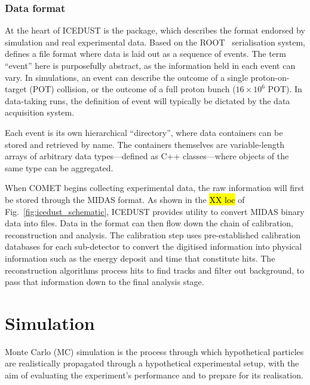 \subsubsection{Data format}
At the heart of ICEDUST is the \oaEvent package, which describes the format endorsed by simulation and real experimental data. Based on the ROOT~\cite{BRUN199781} serialisation system, \oaEvent defines a file format where data is laid out as a sequence of events. The term ``event'' here is purposefully abstract, as the information held in each event can vary. In simulations, an event can describe the outcome of a single proton-on-target (POT) collision, or the outcome of a full proton bunch ($16\times10^6$ POT). 
In data-taking runs, the definition of event will typically be dictated by the data acquisition system.  %

Each event is its own hierarchical ``directory'', where data containers can be stored and retrieved by name. The containers themselves are variable-length arrays of arbitrary data types---defined as C++ classes---where objects of the same type can be aggregated.




When COMET begins collecting experimental data, the raw information will first be stored through the MIDAS format. 
As shown in the \hl{XX loc} of Fig.~\ref{fig:icedust_schematic}, ICEDUST provides utility to convert MIDAS binary data into \oaEvent files. Data in the \oaEvent format can then flow down the chain of calibration, reconstruction and analysis.
The calibration step uses pre-established calibration databases for each sub-detector to convert the digitised information into physical information such as the energy deposit and time that constitute hits. The reconstruction algorithms process hits to find tracks and filter out background, to pass that information down to the final analysis stage.


\section{Simulation}
Monte Carlo (MC) simulation is the process through which hypothetical particles are realistically propagated through a hypothetical experimental setup, with the aim of evaluating the experiment's performance and to prepare for its realisation.

